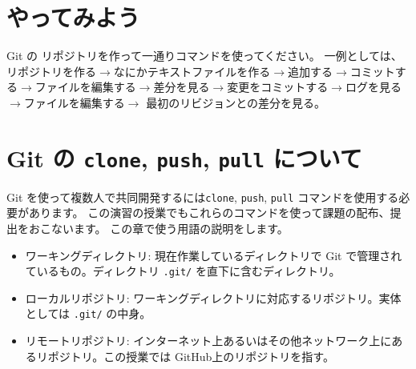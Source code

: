 \documentclass[a4paper,11pt, article]{memoir}
\begin{document}
\section{やってみよう}
Git の リポジトリを作って一通りコマンドを使ってください。
一例としては、リポジトリを作る$\rightarrow$なにかテキストファイルを作る$\rightarrow$追加する$\rightarrow$コミットする$\rightarrow$ファイルを編集する$\rightarrow$差分を見る$\rightarrow$変更をコミットする$\rightarrow$ログを見る
$\rightarrow$ファイルを編集する$\rightarrow$ 最初のリビジョンとの差分を見る。

\section{Git の \texttt{clone}, \texttt{push}, \texttt{pull} について}
Git を使って複数人で共同開発するには\texttt{clone}, \texttt{push}, \texttt{pull} コマンドを使用する必要があります。
この演習の授業でもこれらのコマンドを使って課題の配布、提出をおこないます。
この章で使う用語の説明をします。
\begin{itemize}
\item ワーキングディレクトリ: 現在作業しているディレクトリで Git で管理されているもの。ディレクトリ \texttt{.git/} を直下に含むディレクトリ。
\item ローカルリポジトリ: ワーキングディレクトリに対応するリポジトリ。実体としては \texttt{.git/} の中身。
\item リモートリポジトリ: インターネット上あるいはその他ネットワーク上にあるリポジトリ。この授業では GitHub上のリポジトリを指す。
\end{itemize}
\end{document}
